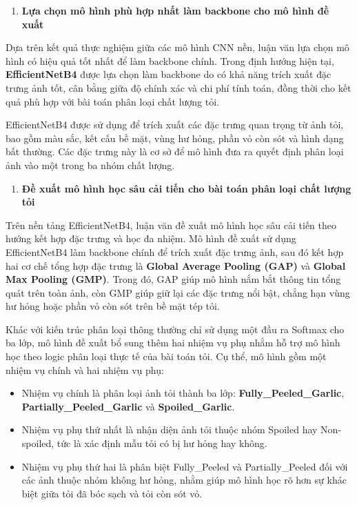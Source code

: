 \documentclass[
]{article}
\begin{document}
\begin{enumerate}
\def\labelenumi{\alph{enumi}.}
\setcounter{enumi}{2}
\item
  \textbf{Lựa chọn mô hình phù hợp nhất làm backbone cho mô hình đề
  xuất}
\end{enumerate}

Dựa trên kết quả thực nghiệm giữa các mô hình CNN nền, luận văn lựa chọn
mô hình có hiệu quả tốt nhất để làm backbone chính. Trong định hướng
hiện tại, \textbf{EfficientNetB4} được lựa chọn làm backbone do có khả
năng trích xuất đặc trưng ảnh tốt, cân bằng giữa độ chính xác và chi phí
tính toán, đồng thời cho kết quả phù hợp với bài toán phân loại chất
lượng tỏi.

EfficientNetB4 được sử dụng để trích xuất các đặc trưng quan trọng từ
ảnh tỏi, bao gồm màu sắc, kết cấu bề mặt, vùng hư hỏng, phần vỏ còn sót
và hình dạng bất thường. Các đặc trưng này là cơ sở để mô hình đưa ra
quyết định phân loại ảnh vào một trong ba nhóm chất lượng.

\begin{enumerate}
\def\labelenumi{\alph{enumi}.}
\setcounter{enumi}{3}
\item
  \textbf{Đề xuất mô hình học sâu cải tiến cho bài toán phân loại chất
  lượng tỏi}
\end{enumerate}

Trên nền tảng EfficientNetB4, luận văn đề xuất mô hình học sâu cải tiến
theo hướng kết hợp đặc trưng và học đa nhiệm. Mô hình đề xuất sử dụng
EfficientNetB4 làm backbone chính để trích xuất đặc trưng ảnh, sau đó
kết hợp hai cơ chế tổng hợp đặc trưng là \textbf{Global Average Pooling
(GAP)} và \textbf{Global Max Pooling (GMP)}. Trong đó, GAP giúp mô hình
nắm bắt thông tin tổng quát trên toàn ảnh, còn GMP giúp giữ lại các đặc
trưng nổi bật, chẳng hạn vùng hư hỏng hoặc phần vỏ còn sót trên bề mặt
tép tỏi.

Khác với kiến trúc phân loại thông thường chỉ sử dụng một đầu ra Softmax
cho ba lớp, mô hình đề xuất bổ sung thêm hai nhiệm vụ phụ nhằm hỗ trợ mô
hình học theo logic phân loại thực tế của bài toán tỏi. Cụ thể, mô hình
gồm một nhiệm vụ chính và hai nhiệm vụ phụ:

\begin{itemize}
\item
  Nhiệm vụ chính là phân loại ảnh tỏi thành ba lớp:
  \textbf{Fully\_Peeled\_Garlic}, \textbf{Partially\_Peeled\_Garlic} và
  \textbf{Spoiled\_Garlic}.
\item
  Nhiệm vụ phụ thứ nhất là nhận diện ảnh tỏi thuộc nhóm Spoiled hay
  Non-spoiled, tức là xác định mẫu tỏi có bị hư hỏng hay không.
\item
  Nhiệm vụ phụ thứ hai là phân biệt Fully\_Peeled và Partially\_Peeled
  đối với các ảnh thuộc nhóm không hư hỏng, nhằm giúp mô hình học rõ hơn
  sự khác biệt giữa tỏi đã bóc sạch và tỏi còn sót vỏ.
\end{itemize}
\end{document}
